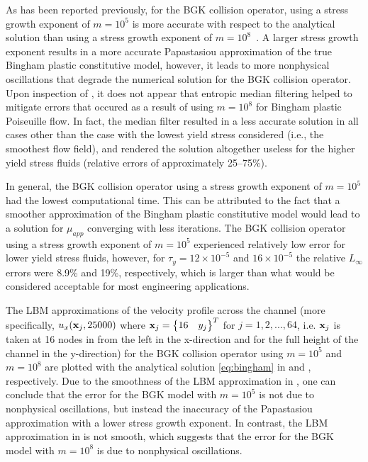 As has been reported previously, for the BGK collision operator, using a stress growth exponent of $m = 10^5$ is more accurate with respect to the analytical solution than using a stress growth exponent of $m = 10^8$~\cite{chen2014simulations}.
A larger stress growth exponent results in a more accurate Papastasiou approximation of the true Bingham plastic constitutive model, however, it leads to more nonphysical oscillations that degrade the numerical solution for the BGK collision operator.
Upon inspection of , it does not appear that entropic median filtering helped to mitigate errors that occured as a result of using $m = 10^8$ for Bingham plastic Poiseuille flow.
In fact, the median filter resulted in a less accurate solution in all cases other than the case with the lowest yield stress considered (i.e., the smoothest flow field), and rendered the solution altogether useless for the higher yield stress fluids (relative errors of approximately 25--75\%).

In general, the BGK collision operator using a stress growth exponent of $m = 10^5$ had the lowest computational time.
This can be attributed to the fact that a smoother approximation of the Bingham plastic constitutive model would lead to a solution for $\mu_{app}$ converging with less iterations.
The BGK collision operator using a stress growth exponent of $m = 10^5$ experienced relatively low error for lower yield stress fluids, however, for $\tau_y = 12 \times 10^{-5}$ and $16 \times 10^{-5}$ the relative $L_\infty$ errors were 8.9\% and 19\%, respectively, which is larger than what would be considered acceptable for most engineering applications.

The LBM approximations of the velocity profile across the channel (more specifically, $u_x(\mathbf{x}_j, 25000)$ where $\mathbf{x}_j = \begin{Bmatrix}16 & y_j\end{Bmatrix}^T$ for $j = 1, 2, ..., 64$, i.e. $\mathbf{x}_j$ is taken at 16 nodes in from the left in the x-direction and for the full height of the channel in the y-direction) for the BGK collision operator using $m = 10^5$ and $m = 10^8$ are plotted with the analytical solution \eqref{eq:bingham} in  and , respectively.
Due to the smoothness of the LBM approximation in , one can conclude that the error for the BGK model with $m = 10^5$ is not due to nonphysical oscillations, but instead the inaccuracy of the Papastasiou approximation with a lower stress growth exponent.
In contrast, the LBM approximation in  is not smooth, which suggests that the error for the BGK model with $m = 10^8$ is due to nonphysical oscillations.

